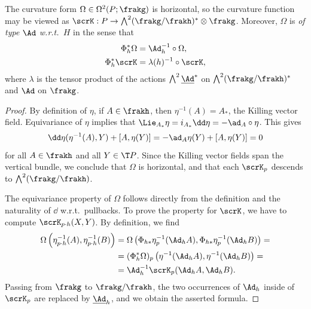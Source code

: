 \begin{lem}\label{lem 1.5.1 Cap}
    The curvature form $\Omega\in\Omega^2(P;\frakg)$ is horizontal, so the curvature function may be viewed as $\scrK:P\to \bigwedge\nolimits^2(\frakg\slash\frakh)^\ast\otimes\frakg$. Moreover, $\Omega$ is \emph{of type $\Ad$ w.r.t.\ $H$} in the sense that 
    \begin{align}
        \Phi_h^\ast \Omega&=\Ad_h^{-1}\circ \Omega,\\
        \Phi_h^\ast\scrK&=\lambda(h)^{-1}\circ\scrK,
    \end{align}
    where $\lambda$ is the tensor product of the actions $\bigwedge\nolimits^2 \underline{\Ad}^\ast$ on $\bigwedge\nolimits^2(\frakg\slash\frakh)^\ast$ and $\Ad$ on $\frakg$.
\end{lem}
\begin{proof}
    By definition of $\eta$, if $A\in\frakh$, then $\eta^{-1}(A)=A_\ast$, the Killing vector field. Equivariance of $\eta$ implies that $\Lie_{A_\ast}\eta=i_{A_\ast}\dd\eta=-\ad_A\circ\eta$. This gives 
    \[\dd\eta(\eta^{-1}(A),Y)+[A,\eta(Y)]=-\ad_{A}\eta(Y)+[A,\eta(Y)]=0\]
    for all $A\in\frakh$ and all $Y\in \T P$. Since the Killing vector fields span the vertical bundle, we conclude that $\Omega$ is horizontal, and that each $\scrK_p$ descends to $\bigwedge\nolimits^2(\frakg\slash\frakh)$.
    
    The equivariance property of $\Omega$ follows directly from the definition and the naturality of $\dd$ w.r.t.\ pullbacks. To prove the property for $\scrK$, we have to compute $\scrK_{p\cdot h}(X,Y)$. By definition, we find 
    \begin{align}
        \Omega\left(\eta_{p\cdot h}^{-1}(A),\eta_{p\cdot h}^{-1}(B)\right)&=\Omega\left(\Phi_{h\ast}\eta^{-1}_p(\Ad_h A),\Phi_{h\ast}\eta^{-1}_p(\Ad_h B)\right)=\notag\\
        &=(\Phi_h^\ast \Omega)_p \left(\eta^{-1}(\Ad_h A),\eta^{-1}(\Ad_h B)\right)=\notag\\
        &=\Ad_h^{-1}\scrK_p(\Ad_h A,\Ad_h B).
    \end{align}
    Passing from $\frakg$ to $\frakg\slash\frakh$, the two occurrences of $\Ad_h$ inside of $\scrK_p$ are replaced by $\underline{\Ad}_h$, and we obtain the asserted formula.
\end{proof}



